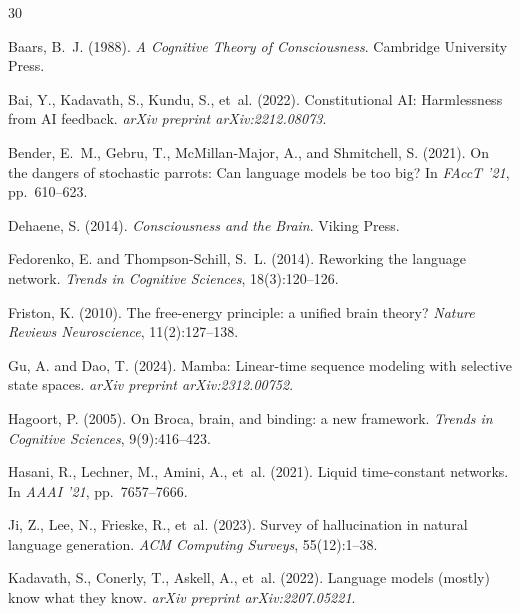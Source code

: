 \documentclass[12pt,a4paper]{article}
\begin{document}

\begin{thebibliography}{30}

Baars, B.~J. (1988).
\newblock \emph{A Cognitive Theory of Consciousness}.
\newblock Cambridge University Press.

Bai, Y., Kadavath, S., Kundu, S., et~al. (2022).
\newblock Constitutional AI: Harmlessness from AI feedback.
\newblock \emph{arXiv preprint arXiv:2212.08073}.

Bender, E.~M., Gebru, T., McMillan-Major, A., and Shmitchell, S. (2021).
\newblock On the dangers of stochastic parrots: Can language models be too big?
\newblock In \emph{FAccT '21}, pp.\ 610--623.

Dehaene, S. (2014).
\newblock \emph{Consciousness and the Brain}.
\newblock Viking Press.

Fedorenko, E. and Thompson-Schill, S.~L. (2014).
\newblock Reworking the language network.
\newblock \emph{Trends in Cognitive Sciences}, 18(3):120--126.

Friston, K. (2010).
\newblock The free-energy principle: a unified brain theory?
\newblock \emph{Nature Reviews Neuroscience}, 11(2):127--138.

Gu, A. and Dao, T. (2024).
\newblock Mamba: Linear-time sequence modeling with selective state spaces.
\newblock \emph{arXiv preprint arXiv:2312.00752}.

Hagoort, P. (2005).
\newblock On Broca, brain, and binding: a new framework.
\newblock \emph{Trends in Cognitive Sciences}, 9(9):416--423.

Hasani, R., Lechner, M., Amini, A., et~al. (2021).
\newblock Liquid time-constant networks.
\newblock In \emph{AAAI '21}, pp.\ 7657--7666.

Ji, Z., Lee, N., Frieske, R., et~al. (2023).
\newblock Survey of hallucination in natural language generation.
\newblock \emph{ACM Computing Surveys}, 55(12):1--38.

Kadavath, S., Conerly, T., Askell, A., et~al. (2022).
\newblock Language models (mostly) know what they know.
\newblock \emph{arXiv preprint arXiv:2207.05221}.


\end{thebibliography}
\end{document}
